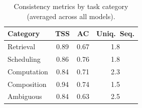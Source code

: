\begin{table}[t]
\centering
\caption{Consistency metrics by task category (averaged across all models).}
\label{tab:category}
\small
\begin{tabular}{lccc}
\toprule
Category & TSS & AC & Uniq.\ Seq. \\
\midrule
Retrieval & 0.89 & 0.67 & 1.8 \\
Scheduling & 0.86 & 0.76 & 1.8 \\
Computation & 0.84 & 0.71 & 2.3 \\
Composition & 0.94 & 0.74 & 1.5 \\
Ambiguous & 0.84 & 0.63 & 2.5 \\
\bottomrule
\end{tabular}
\end{table}